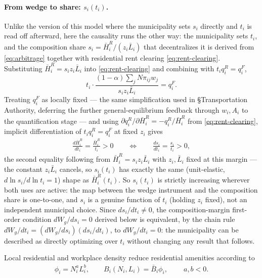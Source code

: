 \documentclass[12pt, a4paper]{article}
\theoremstyle{definition}
\theoremstyle{remark}
\begin{document}
\paragraph{From wedge to share: $s_i(t_i)$.} Unlike the version of this model where the municipality sets $s_i$ directly and $t_i$ is read off afterward, here the causality runs the other way: the municipality sets $t_i$, and the composition share $s_i=\bar H_i^R/(z_i\bar L_i)$ that decentralizes it is derived from \eqref{eq:arbitrage} together with residential rent clearing \eqref{eq:rent-clearing}. Substituting $\bar H_i^R=s_iz_i\bar L_i$ into \eqref{eq:rent-clearing} and combining with $t_iq_i^R=q_i^F$,
\[
t_i\cdot\frac{(1-\alpha)\sum_jN\pi_{ij}w_j}{s_iz_i\bar L_i}=q_i^F.
\]
Treating $q_i^F$ as locally fixed — the same simplification used in \S Transportation Authority, deferring the further general-equilibrium feedback through $w_i,A_i$ to the quantification stage — and using $\partial q_i^R/\partial\bar H_i^R=-q_i^R/\bar H_i^R$ from \eqref{eq:rent-clearing}, implicit differentiation of $t_iq_i^R=q_i^F$ at fixed $z_i$ gives
\begin{align}
    \label{eq:zoning-foc-tax}
    \frac{d\bar H_i^R}{dt_i}=\frac{\bar H_i^R}{t_i}>0
    \qquad\Longleftrightarrow\qquad
    \frac{ds_i}{dt_i}=\frac{s_i}{t_i}>0,
\end{align}
the second equality following from $\bar H_i^R=s_iz_i\bar L_i$ with $z_i,\bar L_i$ fixed at this margin — the constant $z_i\bar L_i$ cancels, so $s_i(t_i)$ has exactly the same (unit-elastic, $d\ln s_i/d\ln t_i=1$) shape as $\bar H_i^R(t_i)$. So $s_i(t_i)$ is strictly increasing wherever both uses are active: the map between the wedge instrument and the composition share is one-to-one, and $s_i$ is a genuine function of $t_i$ (holding $z_i$ fixed), not an independent municipal choice. Since $ds_i/dt_i\neq0$, the composition-margin first-order condition $dW_g/ds_i=0$ derived below is equivalent, by the chain rule $dW_g/dt_i=(dW_g/ds_i)(ds_i/dt_i)$, to $dW_g/dt_i=0$: the municipality can be described as directly optimizing over $t_i$ without changing any result that follows.

Local residential and workplace density reduce residential amenities according to
\begin{align}
    \label{eq:local-congestion}
    \phi_i=N_i^aL_i^b,
    \qquad
    B_i(N_i,L_i)=\bar B_i \phi_i,
    \qquad
    \ a,b<0.
\end{align}
\end{document}
